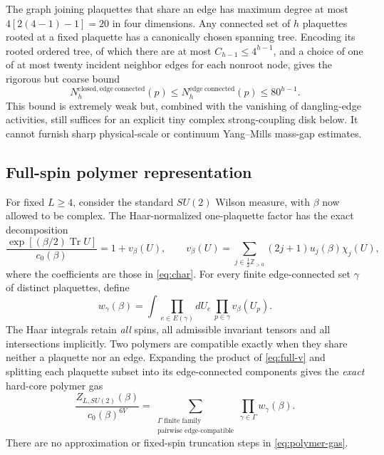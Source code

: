 \documentclass[11pt,a4paper]{article}
\begin{document}
The graph joining plaquettes that share an edge has maximum degree at most \(4[2(4-1)-1]=20\) in four dimensions. Any connected set of \(h\) plaquettes rooted at a fixed plaquette has a canonically chosen spanning tree. Encoding its rooted ordered tree, of which there are at most \(C_{h-1}\le4^{h-1}\), and a choice of one of at most twenty incident neighbor edges for each nonroot node, gives the rigorous but coarse bound
\[
N_h^{\mathrm{closed,edge\ connected}}(p)
\le N_h^{\mathrm{edge\ connected}}(p)\le80^{h-1}.
\]
This bound is extremely weak but, combined with the vanishing of dangling-edge activities, still suffices for an explicit tiny complex strong-coupling disk below. It cannot furnish sharp physical-scale or continuum Yang--Mills mass-gap estimates.



\subsection{Full-spin polymer representation}
For fixed $L\ge4$, consider the standard $SU(2)$ Wilson measure,
with $\beta$ now allowed to be complex. The Haar-normalized
one-plaquette factor has the exact decomposition
\begin{equation}\label{eq:full-v}
\frac{\exp[(\beta/2)\operatorname{Tr}U]}{c_0(\beta)}
=1+v_\beta(U),\qquad
v_\beta(U)=\sum_{j\in\frac12\mathbb Z_{>0}}
(2j+1)u_j(\beta)\chi_j(U),
\end{equation}
where the coefficients are those in \eqref{eq:char}.
For every finite edge-connected set $\gamma$ of distinct plaquettes,
define
\begin{equation}\label{eq:polymer-activity}
w_\gamma(\beta)=\int\prod_{e\in E(\gamma)}dU_e\,
\prod_{p\in\gamma}v_\beta(U_p).
\end{equation}
The Haar integrals retain \emph{all} spins, all admissible
invariant tensors and all intersections implicitly. Two
polymers are compatible exactly when they share neither a plaquette
nor an edge. Expanding the product of \eqref{eq:full-v}
and splitting each plaquette subset into its edge-connected
components gives the \emph{exact} hard-core polymer gas
\begin{equation}\label{eq:polymer-gas}
\frac{Z_{L,SU(2)}(\beta)}{c_0(\beta)^{6V}}
=\sum_{\substack{\Gamma\text{ finite family}\\
                 \text{pairwise edge-compatible}}}
\prod_{\gamma\in\Gamma}w_\gamma(\beta).
\end{equation}
There are no approximation or fixed-spin truncation steps
in \eqref{eq:polymer-gas}.
\end{document}
